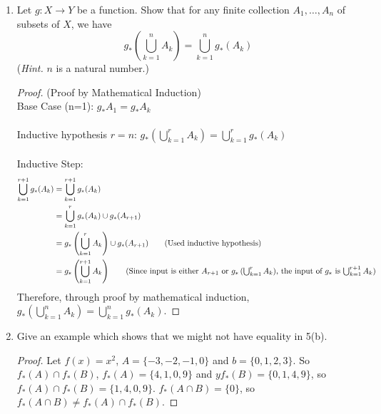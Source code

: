 \documentclass[11pt]{letter}
\theoremstyle{definition}
\begin{document}
\begin{description}
\begin{enumerate}
\begin{enumerate}
                                  
				\end{enumerate}
			\item Let $g:X\rightarrow Y$ be a function. Show that for any finite collection $A_1,\ldots,A_n$ of subsets of $X$, we have
				\begin{equation*}
					g_*\left(\bigcup_{k=1}^nA_k\right)=\bigcup_{k=1}^ng_*(A_k)
				\end{equation*}
				({\em Hint.} $n$ is a natural number.)
			        \begin{proof}(Proof by Mathematical Induction)\\ 
                                  Base Case (n=1): $g_*A_1=g_*A_k$\\ \\
                                  Inductive hypothesis $r=n$: $g_*\left(\bigcup_{k=1}^rA_k\right)=\bigcup_{k=1}^rg_*(A_k)$\\ \\
                                  Inductive Step:
                                  \begin{align*}
                                    \bigcup_{k=1}^{r+1}g_*(A_k)&=\bigcup_{k=1}^{r+1}g_*(A_k) \\
                                    &= \bigcup_{k=1}^rg_*(A_k)\cup g_*(A_{r+1})\\
                                    &=  g_*\left(\bigcup_{k=1}^rA_k\right)\cup g_*(A_{r+1})\tag{Used inductive hypothesis}\\
                                    &=g_*\left(\bigcup_{k=1}^{r+1}A_k\right) \tag{Since input is either $A_{r+1}$ or $g_*\left(\bigcup_{k=1}^rA_k\right)$, the input of $g_*$ is $\bigcup_{k=1}^{r+1}A_k$}\\                                    
                                  \end{align*}
                                  Therefore, through proof by mathematical induction, $g_*\left(\bigcup_{k=1}^nA_k\right)=\bigcup_{k=1}^ng_*(A_k)$.
                                  
                                \end{proof}
                                
			      \item Give an example which shows that we might not have equality in 5(b).
                                \begin{proof}
                                  Let $f(x)=x^2$, $A=\{-3,-2,-1,0\}$ and $b=\{0,1,2,3\}$. So $f_*(A)\cap f_*(B)$, $f_*(A)=\{4,1,0,9\}$ and $yf_*(B)=\{0,1,4,9\}$, so $f_*(A)\cap f_*(B)=\{1,4,0,9\}$. $f_*(A\cap B)=\{0\}$, so $f_*(A\cap B)\neq f_*(A)\cap f_*(B)$.
                                \end{proof}
                                

\end{enumerate}
\end{description}
\end{document}
